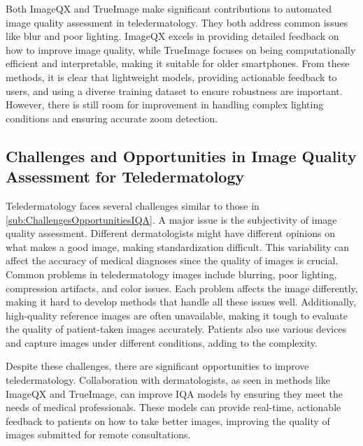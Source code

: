 \par
\vspace{\baselineskip}
\noindent
Both ImageQX and TrueImage make significant contributions to automated image quality assessment in teledermatology. They both address common issues like blur and poor lighting. ImageQX excels in providing detailed feedback on how to improve image quality, while TrueImage focuses on being computationally efficient and interpretable, making it suitable for older smartphones. From these methods, it is clear that lightweight models, providing actionable feedback to users, and using a diverse training dataset to ensure robustness are important. However, there is still room for improvement in handling complex lighting conditions and ensuring accurate zoom detection. \par

\subsection{Challenges and Opportunities in Image Quality Assessment for Teledermatology}
\label{sub:ChallengesOpportunitiesTeledermatology}
Teledermatology faces several challenges similar to those in \autoref{sub:ChallengesOpportunitiesIQA}. A major issue is the subjectivity of image quality assessment. Different dermatologists might have different opinions on what makes a good image, making standardization difficult. This variability can affect the accuracy of medical diagnoses since the quality of images is crucial. Common problems in teledermatology images include blurring, poor lighting, compression artifacts, and color issues. Each problem affects the image differently, making it hard to develop methods that handle all these issues well. Additionally, high-quality reference images are often unavailable, making it tough to evaluate the quality of patient-taken images accurately. Patients also use various devices and capture images under different conditions, adding to the complexity. \par
\vspace{\baselineskip}
\noindent
Despite these challenges, there are significant opportunities to improve teledermatology. Collaboration with dermatologists, as seen in methods like ImageQX and TrueImage, can improve IQA models by ensuring they meet the needs of medical professionals. These models can provide real-time, actionable feedback to patients on how to take better images, improving the quality of images submitted for remote consultations.